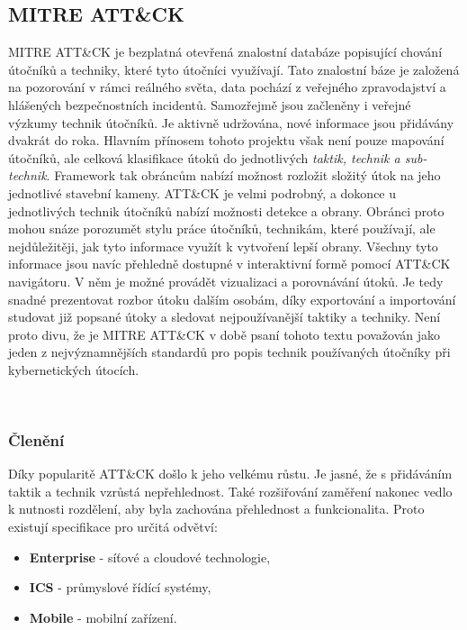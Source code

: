 \subsection{MITRE ATT\&CK}\label{subsec:mitre-att&ck}
MITRE ATT\&CK je bezplatná otevřená znalostní databáze popisující chování útočníků a techniky, které tyto útočníci využívají.
Tato znalostní báze je založená na pozorování v rámci reálného světa, data pochází z veřejného zpravodajství a hlášených bezpečnostních incidentů.
Samozřejmě jsou začleněny i veřejné výzkumy technik útočníků.
Je aktivně udržována, nové informace jsou přidávány dvakrát do roka\cite{mitre_attack_framework_faq}.
Hlavním přínosem tohoto projektu však není pouze mapování útočníků, ale celková klasifikace útoků do jednotlivých \textit{taktik, technik a sub-technik}.
Framework tak obráncům nabízí možnost rozložit složitý útok na jeho jednotlivé stavební kameny.
ATT\&CK je velmi podrobný, a dokonce u jednotlivých technik útočníků nabízí možnosti detekce a obrany.
Obránci proto mohou snáze porozumět stylu práce útočníků, technikám, které používají, ale nejdůležitěji, jak tyto informace využít k vytvoření lepší obrany.
Všechny tyto informace jsou navíc přehledně dostupné v interaktivní formě pomocí ATT\&CK navigátoru\cite{mitre_attack_navigator}.
V něm je možné provádět vizualizaci a porovnávání útoků.
Je tedy snadné prezentovat rozbor útoku dalším osobám,  díky exportování a importování studovat již popsané útoky a sledovat nejpoužívanější taktiky a techniky.
Není proto divu, že je MITRE ATT\&CK v době psaní tohoto textu považován jako jeden z nejvýznamnějších standardů pro popis technik používaných útočníky při kybernetických útocích.\cite{mitre_attack_framework}

~

\subsubsection{Členění}
Díky popularitě ATT\&CK došlo k jeho velkému růstu.
Je jasné, že s přidáváním taktik a technik vzrůstá nepřehlednost.
Také rozšiřování zaměření nakonec vedlo k nutnosti rozdělení, aby byla zachována přehlednost a funkcionalita.
Proto existují specifikace pro určitá odvětví:

\begin{itemize}
	\item \textbf{Enterprise} - síťové a cloudové technologie,
	\item \textbf{ICS} - průmyslové řídící systémy,
	\item \textbf{Mobile} - mobilní zařízení.
\end{itemize}

